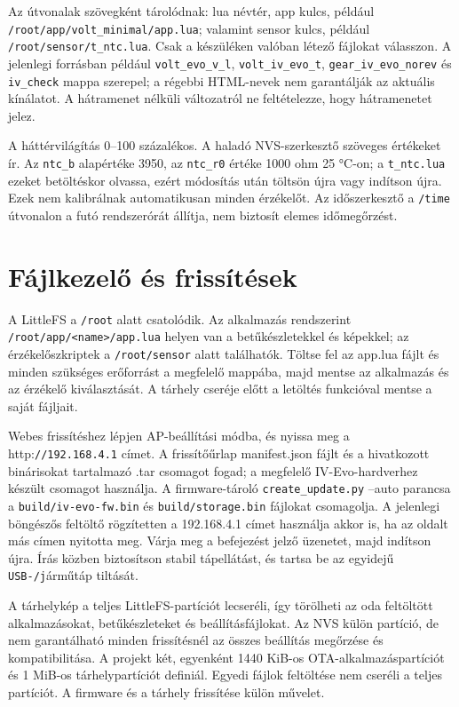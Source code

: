 Az útvonalak szövegként tárolódnak: lua névtér, app kulcs, például \nolinkurl{/root/app/volt_minimal/app.lua}; valamint sensor kulcs, például \nolinkurl{/root/sensor/t_ntc.lua}. Csak a készüléken valóban létező fájlokat válasszon. A jelenlegi forrásban például \nolinkurl{volt_evo_v_l}, \nolinkurl{volt_iv_evo_t}, \nolinkurl{gear_iv_evo_norev} és \nolinkurl{iv_check} mappa szerepel; a régebbi HTML-nevek nem garantálják az aktuális kínálatot. A hátramenet nélküli változatról ne feltételezze, hogy hátramenetet jelez.

A háttérvilágítás 0–100 százalékos. A haladó NVS-szerkesztő szöveges értékeket ír. Az \nolinkurl{ntc_b} alapértéke 3950, az \nolinkurl{ntc_r0} értéke 1000 ohm 25 °C-on; a \nolinkurl{t_ntc.lua} ezeket betöltéskor olvassa, ezért módosítás után töltsön újra vagy indítson újra. Ezek nem kalibrálnak automatikusan minden érzékelőt. Az időszerkesztő a \nolinkurl{/time} útvonalon a futó rendszerórát állítja, nem biztosít elemes időmegőrzést.

\section{Fájlkezelő és frissítések}
A LittleFS a \nolinkurl{/root} alatt csatolódik. Az alkalmazás rendszerint \nolinkurl{/root/app/<name>/app.lua} helyen van a betűkészletekkel és képekkel; az érzékelőszkriptek a \nolinkurl{/root/sensor} alatt találhatók. Töltse fel az app.lua fájlt és minden szükséges erőforrást a megfelelő mappába, majd mentse az alkalmazás és az érzékelő kiválasztását. A tárhely cseréje előtt a letöltés funkcióval mentse a saját fájljait.

Webes frissítéshez lépjen AP-beállítási módba, és nyissa meg a http:\nolinkurl{//192.168.4.1} címet. A frissítőűrlap manifest.json fájlt és a hivatkozott binárisokat tartalmazó .tar csomagot fogad; a megfelelő IV-Evo-hardverhez készült csomagot használja. A firmware-tároló \nolinkurl{create_update.py} --auto parancsa a \nolinkurl{build/iv-evo-fw.bin} és \nolinkurl{build/storage.bin} fájlokat csomagolja. A jelenlegi böngészős feltöltő rögzítetten a 192.168.4.1 címet használja akkor is, ha az oldalt más címen nyitotta meg. Várja meg a befejezést jelző üzenetet, majd indítson újra. Írás közben biztosítson stabil tápellátást, és tartsa be az egyidejű \nolinkurl{USB-/j}árműtáp tiltását.

A tárhelykép a teljes LittleFS-partíciót lecseréli, így törölheti az oda feltöltött alkalmazásokat, betűkészleteket és beállításfájlokat. Az NVS külön partíció, de nem garantálható minden frissítésnél az összes beállítás megőrzése és kompatibilitása. A projekt két, egyenként 1440 KiB-os OTA-alkalmazáspartíciót és 1 MiB-os tárhelypartíciót definiál. Egyedi fájlok feltöltése nem cseréli a teljes partíciót. A firmware és a tárhely frissítése külön művelet.

